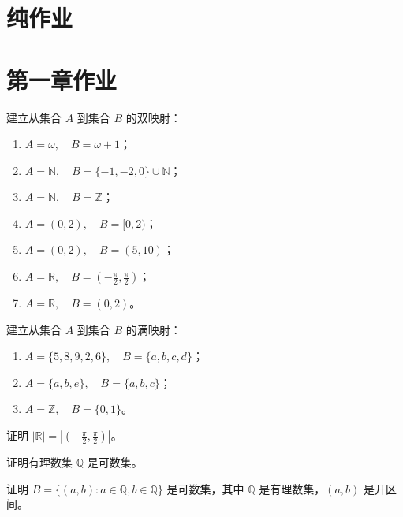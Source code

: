 \chapter{纯作业}


\chapter{第一章作业}
\begin{homework}[1.1]
建立从集合 $A$ 到集合 $B$ 的双映射：
\begin{enumerate}
  \item $A = \omega, \quad B = \omega + 1$；
  \item $A = \mathbb{N}, \quad B = \{-1,-2,0\} \cup \mathbb{N}$；
  \item $A = \mathbb{N}, \quad B = \mathbb{Z}$；
  \item $A = (0,2), \quad B = [0,2)$；
  \item $A = (0,2), \quad B = (5,10)$；
  \item $A = \mathbb{R}, \quad B = \left(-\tfrac{\pi}{2}, \tfrac{\pi}{2}\right)$；
  \item $A = \mathbb{R}, \quad B = (0,2)$。
\end{enumerate}
\end{homework}

\begin{homework}[1.2]
建立从集合 $A$ 到集合 $B$ 的满映射：
\begin{enumerate}
  \item $A = \{5,8,9,2,6\}, \quad B = \{a,b,c,d\}$；
  \item $A = \{a,b,e\}, \quad B = \{a,b,c\}$；
  \item $A = \mathbb{Z}, \quad B = \{0,1\}$。
\end{enumerate}
\end{homework}

\begin{homework}[1.3]
证明 $|\mathbb{R}| = |(-\tfrac{\pi}{2}, \tfrac{\pi}{2})|$。
\end{homework}

\begin{homework}[1.14]
证明有理数集 $\mathbb{Q}$ 是可数集。
\end{homework}

\begin{homework}[1.15]
证明 $B=\{(a,b): a\in \mathbb{Q}, b\in \mathbb{Q}\}$ 是可数集，其中 $\mathbb{Q}$ 是有理数集，$(a,b)$ 是开区间。
\end{homework}

